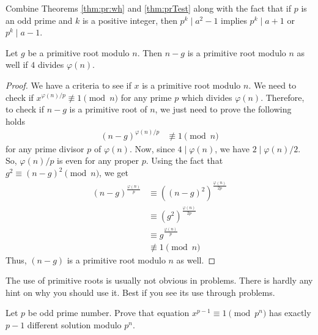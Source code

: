 \documentclass{subfile}
\begin{document}
	\begin{hint}
		Combine Theorems \ref{thm:pr:wh} and \ref{thm:prTest} along with the fact that if $p$ is an odd prime and $k$ is a positive integer, then $p^k \mid a^2-1$ implies $p^k \mid a+1$ or $p^k\mid a-1$.
	\end{hint}

	\begin{theorem}
		Let $g$ be a primitive root modulo $n$. Then $n-g$ is a primitive root modulo $n$ as well if $4$ divides $\varphi(n)$.
	\end{theorem}

	\begin{proof}
		We have a criteria to see if $x$ is a primitive root modulo $n$. We need to check if $x^{{\varphi(n)}/{p}}\not\equiv1\pmod n$ for any prime $p$ which divides $\varphi(n)$. Therefore, to check if $n-g$ is a primitive root of $n$, we just need to prove the following holds
		\begin{align*}
			(n-g)^{{\varphi(n)}/{p}} & \not\equiv1\pmod n
		\end{align*}
		for any prime divisor $p$ of $\varphi(n)$. Now, since $4 \mid \varphi(n)$, we have $2 \mid {\varphi(n)}/{2}$. So, ${\varphi(n)}/{p}$ is even for any proper $p$. Using the fact that $g^2\equiv(n-g)^2\pmod n$, we get
		\begin{align*}
			(n-g)^\frac{\varphi(n)}{p}
				& \equiv\left((n-g)^2\right)^{\frac{\varphi(n)}{2p}}\\
				& \equiv \left(g^2\right)^{\frac{\varphi(n)}{2p}}\\
				& \equiv g^{\frac{\varphi(n)}{p}}\\
				& \not\equiv1\pmod n
		\end{align*}
		Thus, $(n-g)$ is a primitive root modulo $n$ as well.
	\end{proof}
The use of primitive roots is usually not obvious in problems. There is hardly any hint on why you should use it. Best if you see its use through problems.
	\begin{problem}
		Let $p$ be odd prime number. Prove that equation  $x^{p-1}\equiv 1 \pmod{p^n}$ has exactly $p -1$ different solution modulo $p^{n}$.
	\end{problem}
\end{document}
